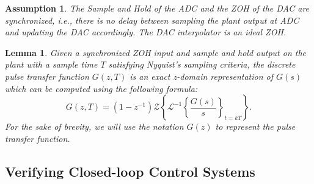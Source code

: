 \documentclass{sig-alternate-05-2015}
\newcommand{\red}[1]{{\color{red}#1}}
\newtheorem{myassumption}{Assumption}
\newtheorem{mylemma}{Lemma}
\begin{document}
\begin{myassumption}
%
The Sample and Hold of the ADC and the ZOH of the DAC are synchronized, {\it i.e.}, there is no delay between
sampling the plant output at ADC and updating the DAC accordingly. The DAC interpolator is an ideal ZOH.
%
\end{myassumption}

\begin{mylemma}\cite{astrom1997computer}
%
Given a synchronized ZOH input and sample and hold output on the plant with a sample time $T$ satisfying Nyquist's sampling criteria, the discrete pulse transfer function $G(z,T)$ is an exact z-domain representation of $G(s)$ which can be computed using the following formula: 
%
\begin{equation}
\label{eq:pulsetf}
G(z,T) = (1-z^{-1})\mathcal{Z}\left\lbrace{\mathcal{L}^{-1}\left\lbrace{\frac{G(s)}{s}}\right\rbrace_{t=kT}}\right\rbrace.
\end{equation}
%
For the sake of brevity, we will use the notation $G(z)$ to represent the pulse transfer function.
%
\end{mylemma}

\subsection{Verifying Closed-loop Control Systems}
\label{verifying-closed-loop-control-systems}



\end{document}
